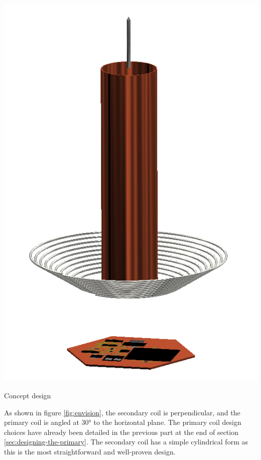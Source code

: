 \begin{marginfigure}[1cm]
    \centering
    \includegraphics[width=1.2\textwidth]{kassandra/resources/JerJerWoBistDuKonzept.PNG}
    \caption{Concept design}
    \label{fig:envision}
\end{marginfigure}

As shown in figure \ref{fig:envision}, the secondary coil is perpendicular, and the primary coil is angled at 30° to the horizontal plane. The primary coil design choices have already been detailed in the previous part at the end of section \ref{sec:designing-the-primary}. The secondary coil has a simple cylindrical form as this is the most straightforward and well-proven design.

